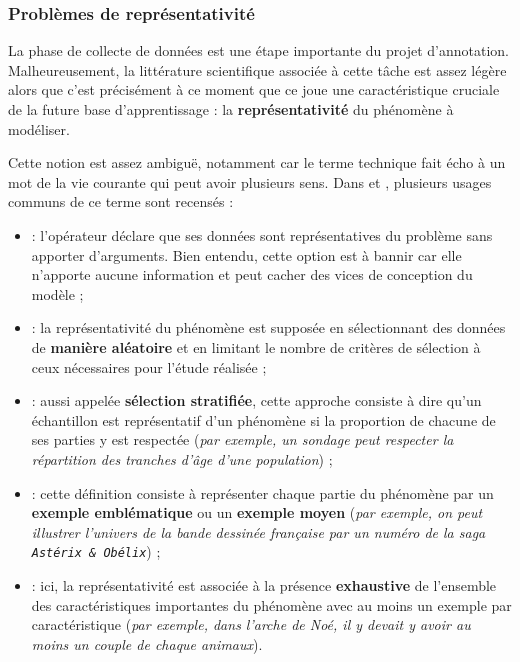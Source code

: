 		
		\subsubsection{Problèmes de représentativité}
		\label{section:2.3.1.A-DEFIS-ANNOTATION-ASPECT-DONNEES-REPRESENTATIVITE}
			
			La phase de collecte de données est une étape importante du projet d'annotation.
			Malheureusement, la littérature scientifique associée à cette tâche est assez légère alors que c'est précisément à ce moment que ce joue une caractéristique cruciale de la future base d'apprentissage : la \textbf{représentativité} du phénomène à modéliser.
			
			Cette notion est assez ambiguë, notamment car le terme technique fait écho à un mot de la vie courante qui peut avoir plusieurs sens.
			Dans \cite{kruskal-mosteller:1979:representative-sampling-nonscientific} et \cite{clemmensen-kjaersgaard:2022:data-representativity-machine}, plusieurs usages communs de ce terme sont recensés :
			\begin{itemize}
				\item {} :
				l'opérateur déclare que ses données sont représentatives du problème sans apporter d'arguments. Bien entendu, cette option est à bannir car elle n'apporte aucune information et peut cacher des vices de conception du modèle ;
				\item {} :
				la représentativité du phénomène est supposée en sélectionnant des données de \textbf{manière aléatoire} et en limitant le nombre de critères de sélection à ceux nécessaires pour l'étude réalisée ; 
				\item {} :
				aussi appelée \textbf{sélection stratifiée}, cette approche consiste à dire qu'un échantillon est représentatif d'un phénomène si la proportion de chacune de ses parties y est respectée
				(\textit{par exemple, un sondage peut respecter la répartition des tranches d'âge d'une population}) ;
				\item {} :
				cette définition consiste à représenter chaque partie du phénomène par un \textbf{exemple emblématique} ou un \textbf{exemple moyen}
				(\textit{par exemple, on peut illustrer l'univers de la bande dessinée française par un numéro de la saga \texttt{Astérix \& Obélix}}) ;
				\item {} :
				ici, la représentativité est associée à la présence \textbf{exhaustive} de l'ensemble des caractéristiques importantes du phénomène avec au moins un exemple par caractéristique
				(\textit{par exemple, dans l'arche de Noé, il y devait y avoir au moins un couple de chaque animaux}).
			\end{itemize}
			
